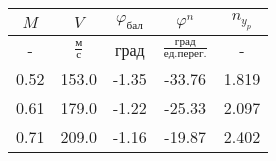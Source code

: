 \begin{tabular}{|c|c|c|c|c|}
\hline
$M$ & $V$ & $\varphi_{бал}$ & $\varphi^{n}$ & $n_{y_{p}}$ \\ 
\hline
- & $\frac{м}{с}$ & град & $\frac{град}{ед.перег.}$ & - \\ 
\hline
0.52 & 153.0 & -1.35 & -33.76 & 1.819 \\ 
\hline
0.61 & 179.0 & -1.22 & -25.33 & 2.097 \\ 
\hline
0.71 & 209.0 & -1.16 & -19.87 & 2.402 \\ 
\hline
\end{tabular}